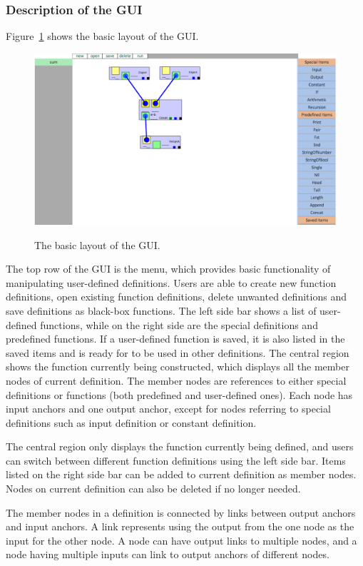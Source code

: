 \documentclass[12pt,UTF8,a4]{article}
\begin{document}
\subsubsection{Description of the GUI}
Figure~\ref{fig:gui} shows the basic layout of the GUI.
\begin{figure}[!ht]
\center
\includegraphics[width=.95\textwidth]{./images/gui.png} \\
\caption{The basic layout of the GUI.}\label{fig:gui}
\end{figure}
The top row of the GUI is the menu, which provides basic functionality of manipulating user-defined definitions. Users are able to create new function definitions, open existing function definitions, delete unwanted definitions and save definitions as black-box functions. The left side bar shows a list of user-defined functions, while on the right side are the special definitions and predefined functions. If a user-defined function is saved, it is also listed in the saved items and is ready for to be used in other definitions. The central region shows the function currently being constructed, which displays all the member nodes of current definition. The member nodes are references to either special definitions or functions (both predefined and user-defined ones). Each node has input anchors and one output anchor, except for nodes referring to special definitions such as input definition or constant definition.

The central region only displays the function currently being defined, and users can switch between different function definitions using the left side bar. Items listed on the right side bar can be added to current definition as member nodes. Nodes on current definition can also be deleted if no longer needed.

The member nodes in a definition is connected by links between output anchors and input anchors. A link represents using the output from the one node as the input for the other node. A node can have output links to multiple nodes, and a node having multiple inputs can link to output anchors of different nodes.
\end{document}
